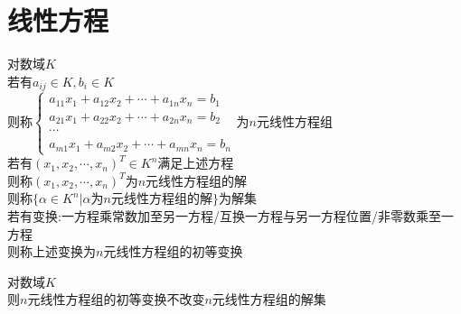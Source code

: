 

%

\setcounter{section}{0}
\setcounter{subsection}{0}

\chapter{线性方程}

\begin{dingyi}
对数域$K$\\
若有$a_{ij}\in K,b_{i}\in K$\\
则称$\begin{cases}a_{11}x_1+a_{12}x_2+\cdots+a_{1n}x_n=b_1\\ a_{21}x_1+a_{22}x_2+\cdots+a_{2n}x_n=b_2\\ \cdots\\ a_{m1}x_1+a_{m2}x_2+\cdots+a_{mn}x_n=b_n\end{cases}$为$n$元线性方程组\\
若有$(x_1,x_2,\cdots,x_n)^{T}\in K^n$满足上述方程\\
则称$(x_1,x_2,\cdots,x_n)^{T}$为$n$元线性方程组的解\\
则称$\{\alpha\in K^n|\alpha\text{为}n\text{元线性方程组的解}\}$为解集\\
若有变换:一方程乘常数加至另一方程/互换一方程与另一方程位置/非零数乘至一方程\\
则称上述变换为$n$元线性方程组的初等变换
\end{dingyi}

\begin{dingli}
对数域$K$\\
则$n$元线性方程组的初等变换不改变$n$元线性方程组的解集
\end{dingli}

